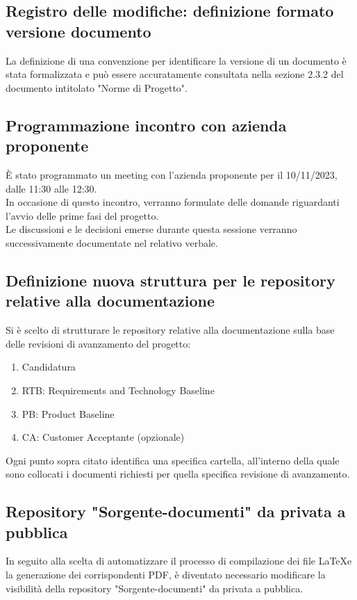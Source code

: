\documentclass{article}
\begin{document}
    \subsection{Registro delle modifiche: definizione formato versione documento}
    La definizione di una convenzione per identificare la versione di un documento è stata formalizzata e può essere accuratamente consultata nella sezione 2.3.2 del documento intitolato "Norme di Progetto".

    \subsection{Programmazione incontro con azienda proponente}
        È stato programmato un meeting con l'azienda proponente per il 10/11/2023, dalle 11:30 alle 12:30.\\
        In occasione di questo incontro, verranno formulate delle domande riguardanti l'avvio delle prime fasi del progetto.\\
        Le discussioni e le decisioni emerse durante questa sessione verranno successivamente documentate nel relativo verbale.    
    
    \subsection{Definizione nuova struttura per le repository relative alla documentazione}
        Si è scelto di strutturare le repository relative alla documentazione sulla base delle revisioni di avanzamento del progetto:
        \begin{enumerate}
            \item Candidatura
            \item RTB: Requirements and Technology Baseline
            \item PB: Product Baseline
            \item CA: Customer Acceptante (opzionale)
        \end{enumerate}
        Ogni punto sopra citato identifica una specifica cartella, all'interno della quale sono collocati i documenti richiesti per quella specifica revisione di avanzamento.

    \subsection{Repository "Sorgente-documenti" da privata a pubblica}
        In seguito alla scelta di automatizzare il processo di compilazione dei file \LaTeX e la generazione dei corrispondenti PDF, è diventato necessario modificare la visibilità della repository "Sorgente-documenti" da privata a pubblica.
\end{document}
